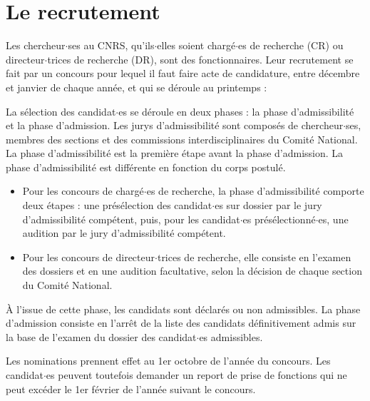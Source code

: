\section{Le recrutement}
\label{sec. recrutCNRS}


Les chercheur$\cdot$ses au CNRS, qu'ils$\cdot$elles soient charg\'e$\cdot$es de recherche (CR)
ou directeur$\cdot$trices de recherche (DR), sont des fonctionnaires. Leur
recrutement se fait par un concours pour lequel il faut faire acte
de candidature, entre d\'ecembre et janvier de
chaque ann\'ee, et qui se d\'eroule au printemps : \\

La s\'election des candidat$\cdot$es se d\'eroule  en deux phases : la phase d'admissibilit\'e et la phase d'admission. Les jurys d'admissibilit\'e sont compos\'es de chercheur$\cdot$ses, membres des sections et des commissions interdisciplinaires du Comit\'e National. La phase d'admissibilit\'e est la premi\`ere \'etape avant la phase d'admission. La phase d'admissibilit\'e est diff\'erente en fonction du corps postul\'e.
\begin{itemize}
\item    Pour les concours de charg\'e$\cdot$es de recherche, la phase d'admissibilit\'e comporte deux \'etapes : une pr\'es\'election des candidat$\cdot$es sur dossier par le jury d'admissibilit\'e comp\'etent, puis, pour les candidat$\cdot$es pr\'es\'electionn\'e$\cdot$es, une audition par le jury d'admissibilit\'e comp\'etent.
\item  Pour les concours de directeur$\cdot$trices de recherche, elle consiste en l'examen des dossiers et en une audition facultative, selon la d\'ecision de chaque section du Comit\'e National. 
  \end{itemize}
    \`A l'issue de cette phase, les candidats sont d\'eclar\'es ou non admissibles.
    La phase d'admission consiste en l'arr\^et de la liste des candidats d\'efinitivement admis sur la base de l'examen du dossier des candidat$\cdot$es admissibles.

Les nominations prennent effet au 1er octobre de l'ann\'ee du concours. Les candidat$\cdot$es peuvent toutefois demander un report de prise de fonctions qui ne peut exc\'eder le 1er f\'evrier de l'ann\'ee suivant le concours.


